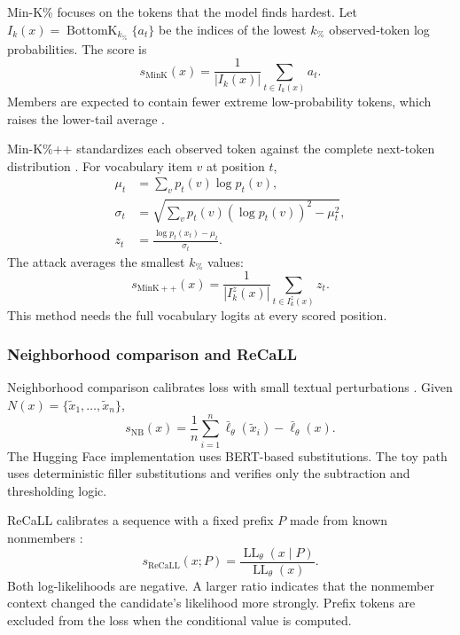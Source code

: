 \documentclass[11pt]{article}
\newcommand{\LL}{\operatorname{LL}}
\newcommand{\BottomK}{\operatorname{BottomK}}
\begin{document}
Min-K\% focuses on the tokens that the model finds hardest. Let $I_k(x)=\BottomK_{k_{\%}}\{a_t\}$ be the indices of the lowest $k_{\%}$ observed-token log probabilities. The score is
\begin{equation}
    s_{\mathrm{MinK}}(x)=\frac{1}{|I_k(x)|}\sum_{t\in I_k(x)}a_t.
    \label{eq:mink}
\end{equation}
Members are expected to contain fewer extreme low-probability tokens, which raises the lower-tail average \citep{shi2024detecting}.

Min-K\%++ standardizes each observed token against the complete next-token distribution \citep{zhang2025minkpp}. For vocabulary item $v$ at position $t$,
\begin{align}
    \mu_t &= \sum_v p_t(v)\log p_t(v),\\
    \sigma_t &= \sqrt{\sum_v p_t(v)(\log p_t(v))^2-\mu_t^2},\\
    z_t &= \frac{\log p_t(x_t)-\mu_t}{\sigma_t}.
\end{align}
The attack averages the smallest $k_{\%}$ values:
\begin{equation}
    s_{\mathrm{MinK++}}(x)=\frac{1}{|I_k^z(x)|}\sum_{t\in I_k^z(x)}z_t.
    \label{eq:minkpp}
\end{equation}
This method needs the full vocabulary logits at every scored position.

\subsubsection{Neighborhood comparison and ReCaLL}

Neighborhood comparison calibrates loss with small textual perturbations \citep{mattern2023membership}. Given $N(x)=\{\widetilde x_1,\ldots,\widetilde x_n\}$,
\begin{equation}
    s_{\mathrm{NB}}(x)=\frac{1}{n}\sum_{i=1}^{n}\bar\ell_\theta(\widetilde x_i)-\bar\ell_\theta(x).
    \label{eq:neighborhood}
\end{equation}
The Hugging Face implementation uses BERT-based substitutions. The toy path uses deterministic filler substitutions and verifies only the subtraction and thresholding logic.

ReCaLL calibrates a sequence with a fixed prefix $P$ made from known nonmembers \citep{xie2024recall}:
\begin{equation}
    s_{\mathrm{ReCaLL}}(x;P)=\frac{\LL_\theta(x\mid P)}{\LL_\theta(x)}.
    \label{eq:recall}
\end{equation}
Both log-likelihoods are negative. A larger ratio indicates that the nonmember context changed the candidate's likelihood more strongly. Prefix tokens are excluded from the loss when the conditional value is computed.
\end{document}
